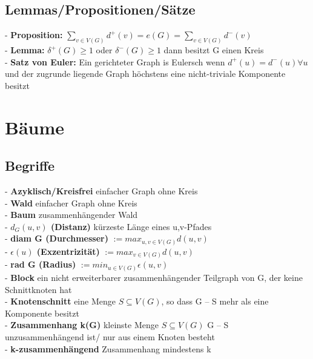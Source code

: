 \documentclass{article}
\begin{document}
\begin{multicols*}{3}
    \subsection{Lemmas/Propositionen/Sätze}
        - \textbf{Proposition:} $\sum_{v \in V(G)} d^+(v) = e(G) = \sum_{v \in V(G)} d^-(v)$
        \\- \textbf{Lemma:} $\delta^+(G) \geq 1$ oder $\delta^-(G) \geq 1$ dann besitzt G einen Kreis
        \\- \textbf{Satz von Euler:} Ein gerichteter Graph is Eulersch wenn $d^+(u) = d^-(u) \forall u$ und der zugrunde liegende Graph höchstens eine nicht-triviale Komponente besitzt
\section{Bäume}
    \subsection{Begriffe}
        - \textbf{Azyklisch/Kreisfrei} einfacher Graph ohne Kreis
        \\- \textbf{Wald} einfacher Graph ohne Kreis
        \\- \textbf{Baum} zusammenhängender Wald
        \\- \textbf{$d_G(u,v)$ (Distanz)} kürzeste Länge eines u,v-Pfades 
        \\- \textbf{diam G (Durchmesser)} $:= max_{u,v \in V(G)} d(u,v)$
        \\- \textbf{ $\epsilon(u)$ (Exzentrizität)} $:= max_{v \in V(G)} d(u,v)$
        \\- \textbf{rad G (Radius)} $:= min_{u \in V(G)} \epsilon(u,v)$
        \\- \textbf{Block} ein nicht erweiterbarer zusammenhängender Teilgraph von G, der keine Schnittknoten hat 
        \\- \textbf{Knotenschnitt} eine Menge $S \subseteq V(G)$, so dass G – S mehr als eine Komponente besitzt
        \\- \textbf{Zusammenhang k(G)} kleinste Menge $S \subseteq V(G)$  G – S unzusammenhängend ist/ nur aus einem Knoten besteht
        \\- \textbf{k-zusammenhängend} Zusammenhang mindestens k 

\end{multicols*}
\end{document}
